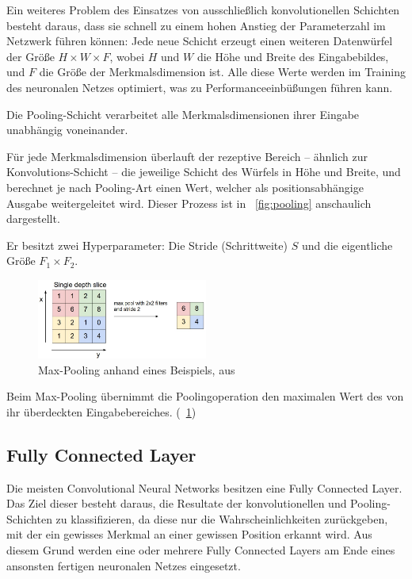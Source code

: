 Ein weiteres Problem des Einsatzes von ausschließlich konvolutionellen Schichten besteht daraus, dass sie schnell zu einem hohen Anstieg der Parameterzahl im Netzwerk führen können: Jede neue Schicht erzeugt einen weiteren Datenwürfel der Größe $H\times W\times F$, wobei $H$ und $W$ die Höhe und Breite des Eingabebildes, und $F$ die Größe der Merkmalsdimension ist. Alle diese Werte werden im Training des neuronalen Netzes optimiert, was zu Performanceeinbüßungen führen kann. \cite{cs231n}

Die Pooling-Schicht verarbeitet alle Merkmalsdimensionen ihrer Eingabe unabhängig voneinander.

Für jede Merkmalsdimension überlauft der rezeptive Bereich -- ähnlich zur Konvolutions-Schicht -- die jeweilige Schicht des Würfels in Höhe und Breite, und berechnet je nach Pooling-Art einen Wert, welcher als positionsabhängige Ausgabe weitergeleitet wird. Dieser Prozess ist in \figurename~\ref{fig:pooling} anschaulich dargestellt.

Er besitzt zwei Hyperparameter: Die Stride (Schrittweite) $S$ und die eigentliche Größe $F_1\times F_2$. \cite{cs231n}

\begin{figure}[H]
	\centering
	\includegraphics[width=0.5\textwidth,keepaspectratio]{images/cs231n/maxpool.jpg}
	\captionsetup{format=plain}
	\caption{Max-Pooling anhand eines Beispiels, aus \cite{cs231n}}
	\label{fig:maxpooling}
\end{figure}

Beim Max-Pooling übernimmt die Poolingoperation den maximalen Wert des von ihr überdeckten Eingabebereiches. (\vgl \figurename~\ref{fig:maxpooling})

\subsection{Fully Connected Layer}
\label{ssec:fcn}
Die meisten Convolutional Neural Networks besitzen eine Fully Connected Layer. Das Ziel dieser besteht daraus, die Resultate der konvolutionellen und Pooling-Schichten zu klassifizieren, da diese nur die Wahrscheinlichkeiten zurückgeben, mit der ein gewisses Merkmal an einer gewissen Position erkannt wird. Aus diesem Grund werden eine oder mehrere Fully Connected Layers am Ende eines ansonsten fertigen neuronalen Netzes eingesetzt. \cite{geva}

